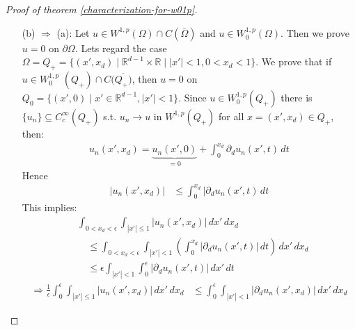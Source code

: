 \documentclass{report}
\theoremstyle{tommy}
\begin{document}
\begin{proof}[Proof of theorem \ref{characterization-for-w01p}]
\begin{itemize}
      \begin{align*}
        \int_\Omega |u_n(x) - u(x)|^p \, dx \to 0
      \end{align*}
      since \(u_n(x) = \frac{1}{n} G(nu(x)) \xrightarrow{n \to \infty} u(x)\) for all \(x \in \Omega\) and \(|u_n(x)| \le \frac{1}{n} |G(nu(x))| \le \frac{1}{n} |nu(x)| \le |u(x)| \in L^p(\Omega)\).
      \begin{align*}
        \int_\Omega|\nabla u_n(x) - \nabla u(x)|^p \, dx 
        &= \int_\Omega |G'(nu(x)) - 1|^p |\nabla u(x)|^p \, dx \to 0
      \end{align*}
      as \(|G'(v(x))-1| \to 0\) for all \(x\) s.t. \(u(x) \ne 0\) and \(\nabla u(x) = 0\) on \(\{x \mid u(x) = 0\}\).  (exercise)
      \item [(b) \(\Rightarrow\) (a):] Let \(u \in W^{1,p}(\Omega) \cap C(\bar \Omega)\) and \(u \in W_0^{1,p}(\Omega)\). Then we prove \(u = 0\) on \(\partial \Omega\). Lets regard the case \(\Omega = Q_+ = \{(x',x_d) \mid \mathbb{R}^{d-1} \times \mathbb{R} \mid |x'|<1, 0 < x_d < 1\}\). 
      We prove that if \(u \in W_0^{1,p} \)
      \((Q_+) \cap C(\overline {Q_+)}\), then \(u = 0\) on \(Q_0 = \{(x', 0) \mid x' \in \mathbb{R}^{d-1}, |x'| < 1\}\). Since \(u \in W_0^{1,p}(Q_+)\) there is \(\{u_n\} \subseteq C_c^\infty(Q_+)\) s.t. \(u_n \to u\) in \(W^{1,p}(Q_+)\) for all \(x = (x', x_d) \in Q_+\), then:
      \begin{align*}
        u_n(x', x_d) = \underbrace{u_n(x', 0)}_{= 0} + \int_0^{x_d} \partial_d u_n(x', t) \, dt
      \end{align*}
      Hence 
      \begin{align*}
        |u_n(x', x_d)| &\le \int_0^{x_d} |\partial_d u_n(x', t) \, dt
      \end{align*}
      This implies:
      \begin{align*}
        &\int_{0 < x_d < \epsilon} \int_{|x'| \le 1} |u_n(x', x_d)| \, dx' \, dx_d \\
        &\quad \le \int_{0 < x_d < \epsilon} \int_{|x'| < 1} \left(\int_0^{x_d}|\partial_d u_n(x', t)| \, dt\right) \, dx' \, dx_d \\
        &\quad \le \epsilon \int_{|x'| < 1} \int_0^\epsilon |\partial_d u_n(x', t)| \, dx' \, dt
      \end{align*}
      \begin{align*}
        \Rightarrow \frac{1}{\epsilon} \int_0^\epsilon \int_{|x'| \le 1} |u_n(x', x_d)| \, dx' \, dx_d 
        &\le \int_0^\epsilon \int_{|x'| < 1} |\partial_d u_n(x', x_d)| \, dx' \, dx_d

\end{align*}
\end{itemize}
\end{proof}
\end{document}
